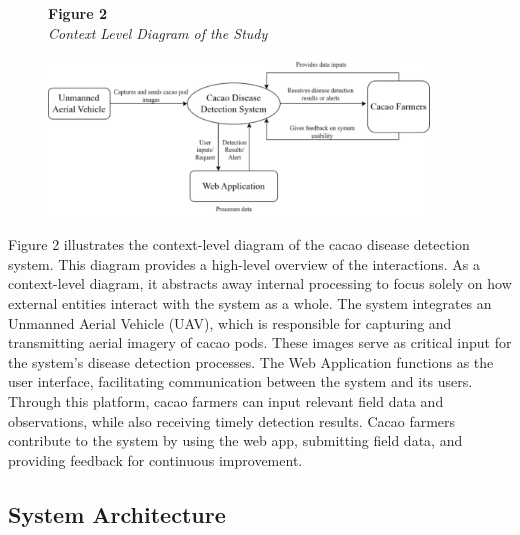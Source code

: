 	\begin{figure}[H]
		\raggedright
		\textbf{Figure 2} \\ %
		\textit{Context Level Diagram of the Study} %
		
		\vspace{0.5em}
		\centering
		\includegraphics[width=0.9\textwidth]{figures/Context_Level.pdf} %
		
		\vspace{0.5em}
		\raggedright
		
		\label{fig:context-level}
	\end{figure}
	
	Figure 2 illustrates the context-level diagram of the cacao disease detection system. This diagram provides a high-level overview of the interactions. As a context-level diagram, it abstracts away internal processing to focus solely on how external entities interact with the system as a whole. The system integrates an Unmanned Aerial Vehicle (UAV), which is responsible for capturing and transmitting aerial imagery of cacao pods. These images serve as critical input for the system’s disease detection processes. The Web Application functions as the user interface, facilitating communication between the system and its users. Through this platform, cacao farmers can input relevant field data and observations, while also receiving timely detection results. Cacao farmers contribute to the system by using the web app, submitting field data, and providing feedback for continuous improvement.
	
	\subsection{System Architecture}
	
